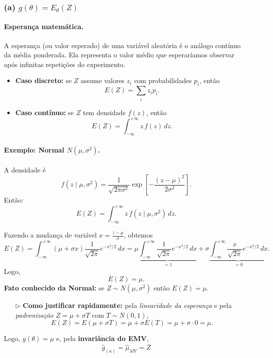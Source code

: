 
\subsubsection*{(a) \; $g(\theta)=E_\theta(Z)$}
\paragraph{Esperança matemática.}
A esperança (ou valor esperado) de uma variável aleatória é o análogo contínuo da média ponderada.  
Ela representa o valor médio que esperaríamos observar após infinitas repetições do experimento.

\begin{itemize}
  \item \textbf{Caso discreto:} se $Z$ assume valores $z_i$ com probabilidades $p_i$, então
  \[
  E(Z)=\sum_i z_i p_i.
  \]
  \item \textbf{Caso contínuo:} se $Z$ tem densidade $f(z)$, então
  \[
  E(Z)=\int_{-\infty}^{+\infty} z\,f(z)\,dz.
  \]
\end{itemize}

\paragraph{Exemplo: Normal $N(\mu,\sigma^2)$.}
A densidade é
\[
f(z\mid\mu,\sigma^2)
=\frac{1}{\sqrt{2\pi\sigma^2}}\exp\!\left[-\frac{(z-\mu)^2}{2\sigma^2}\right].
\]
Então:
\[
E(Z)
=\int_{-\infty}^{+\infty} z\,f(z\mid\mu,\sigma^2)\,dz.
\]

Fazendo a mudança de variável $x=\frac{z-\mu}{\sigma}$, obtemos
\[
E(Z)
=\int_{-\infty}^{+\infty}(\mu+\sigma x)
\frac{1}{\sqrt{2\pi}}e^{-x^2/2}\,dx
=\mu\underbrace{\int_{-\infty}^{+\infty}\frac{1}{\sqrt{2\pi}}e^{-x^2/2}\,dx}_{=1}
+\sigma\underbrace{\int_{-\infty}^{+\infty}\frac{x}{\sqrt{2\pi}}e^{-x^2/2}\,dx}_{=0}.
\]
Logo,
\[
\boxed{E(Z)=\mu.}
\]
\textbf{Fato conhecido da Normal:} se $Z \sim N(\mu,\sigma^2)$ então $E(Z)=\mu$.
\begin{itemize}
  \item[\(\triangleright\)] \textbf{Como justificar rapidamente:} pela \emph{linearidade da esperança} e pela
  \emph{padronização} $Z=\mu+\sigma T$ com $T\sim N(0,1)$,
  \[
  E(Z)=E(\mu+\sigma T)=\mu+\sigma E(T)=\mu+ \sigma\cdot 0=\mu .
  \]
\end{itemize}
Logo, $g(\theta)=\mu$ e, pela \textbf{invariância do EMV},
\[
\boxed{\;\widehat g_{(a)}=\widehat\mu_{MV}=\overline Z\;}
\]

